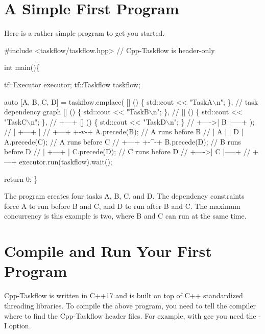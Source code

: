 \hypertarget{index_ASimpleFirstProgram}{}\section{A Simple First Program}\label{index_ASimpleFirstProgram}
Here is a rather simple program to get you started.


\begin{DoxyCode}
\textcolor{preprocessor}{#include <taskflow/taskflow.hpp>}  \textcolor{comment}{// Cpp-Taskflow is header-only}

\textcolor{keywordtype}{int} main()\{
  
  tf::Executor executor;
  tf::Taskflow taskflow;

  \textcolor{keyword}{auto} [A, B, C, D] = taskflow.emplace(
    [] () \{ std::cout << \textcolor{stringliteral}{"TaskA\(\backslash\)n"}; \},               \textcolor{comment}{//  task dependency graph}
    [] () \{ std::cout << \textcolor{stringliteral}{"TaskB\(\backslash\)n"}; \},               \textcolor{comment}{// }
    [] () \{ std::cout << \textcolor{stringliteral}{"TaskC\(\backslash\)n"}; \},               \textcolor{comment}{//          +---+          }
    [] () \{ std::cout << \textcolor{stringliteral}{"TaskD\(\backslash\)n"}; \}                \textcolor{comment}{//    +---->| B |-----+   }
  );                                                 \textcolor{comment}{//    |     +---+     |}
                                                     \textcolor{comment}{//  +---+           +-v-+ }
  A.precede(B);  \textcolor{comment}{// A runs before B                  //  | A |           | D | }
  A.precede(C);  \textcolor{comment}{// A runs before C                  //  +---+           +-^-+ }
  B.precede(D);  \textcolor{comment}{// B runs before D                  //    |     +---+     |    }
  C.precede(D);  \textcolor{comment}{// C runs before D                  //    +---->| C |-----+    }
                                                     \textcolor{comment}{//          +---+          }
  executor.run(taskflow).wait();

  \textcolor{keywordflow}{return} 0;
\}
\end{DoxyCode}


The program creates four tasks A, B, C, and D. The dependency constraints force A to run before B and C, and D to run after B and C. The maximum concurrency is this example is two, where B and C can run at the same time.\hypertarget{index_CompileAndRunYourFirstProgram}{}\section{Compile and Run Your First Program}\label{index_CompileAndRunYourFirstProgram}
Cpp-\/\+Taskflow is written in C++17 and is built on top of C++ standardized threading libraries. To compile the above program, you need to tell the compiler where to find the Cpp-\/\+Taskflow header files. For example, with gcc you need the {\ttfamily -\/I} option.


